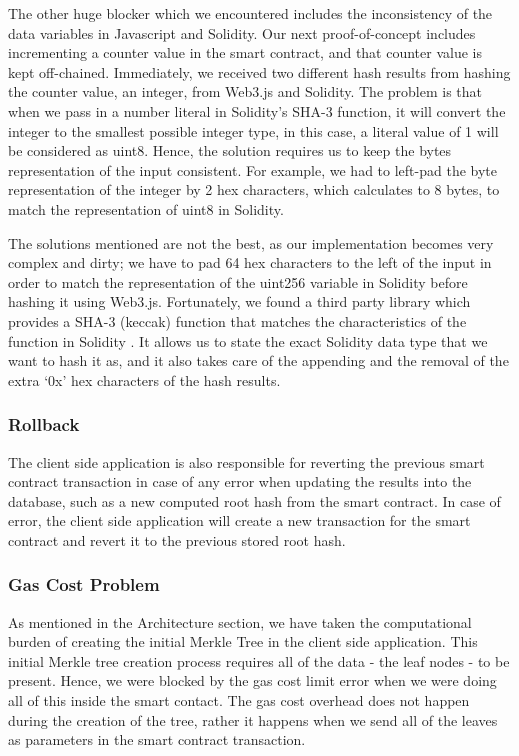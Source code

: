 The other huge blocker which we encountered includes the inconsistency of the data variables in Javascript and Solidity. Our next proof-of-concept includes incrementing a counter value in the smart contract, and that counter value is kept off-chained. Immediately, we received two different hash results from hashing the counter value, an integer, from Web3.js and Solidity. The problem is that when we pass in a number literal in Solidity’s SHA-3 function, it will convert the integer to the smallest possible integer type, in this case, a literal value of 1 will be considered as uint8. Hence, the solution requires us to keep the bytes representation of the input consistent. For example, we had to left-pad the byte representation of the integer by 2 hex characters, which calculates to 8 bytes, to match the representation of uint8 in Solidity. 

The solutions mentioned are not the best, as our implementation becomes very complex and dirty; we have to pad 64 hex characters to the left of the input in order to match the representation of the uint256 variable in Solidity before hashing it using Web3.js. Fortunately, we found a third party library which provides a SHA-3 (keccak) function that matches the characteristics of the function in Solidity \cite{web3util}. It allows us to state the exact Solidity data type that we want to hash it as, and it also takes care of the appending and the removal of the extra ‘0x’ hex characters of the hash results.

\subsubsection*{Rollback}

The client side application is also responsible for reverting the previous smart contract transaction in case of any error when updating the results into the database, such as a new computed root hash from the smart contract. In case of error, the client side application will create a new transaction for the smart contract and revert it to the previous stored root hash.

\subsubsection*{Gas Cost Problem}

As mentioned in the Architecture section, we have taken the computational burden of creating the initial Merkle Tree in the client side application. This initial Merkle tree creation process requires all of the data - the leaf nodes - to be present. Hence, we were blocked by the gas cost limit error when we were doing all of this inside the smart contact. The gas cost overhead does not happen during the creation of the tree, rather it happens when we send all of the leaves as parameters in the smart contract transaction. 

